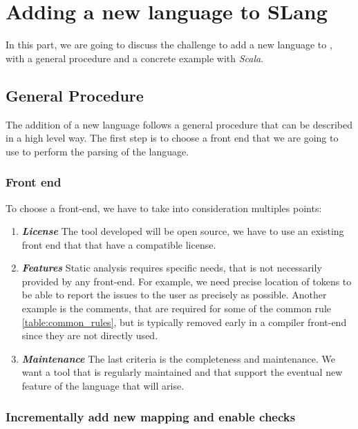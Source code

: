 \section{Adding a new language to SLang}
\label{sec:new_language}

In this part, we are going to discuss the challenge to add a new language to \slang{}, with a general procedure and a concrete example with \emph{Scala}.

\subsection{General Procedure}
\label{subsec:general_procedure}

The addition of a new language follows a general procedure that can be described in a high level way.
The first step is to choose a front end that we are going to use to perform the parsing of the language.

\subsubsection{Front end}
\label{subsubsec:front_end}

To choose a front-end, we have to take into consideration multiples points:
\begin{enumerate}
	\item \textbf{\textit{License}} \newline The tool developed will be open source, we have to use an existing front end that that have a compatible license.
	\item \textbf{\textit{Features}} \newline Static analysis requires specific needs, that is not necessarily provided by any front-end. 	For example, we need precise location of tokens to be able to report the issues to the user as precisely as possible. Another example is the comments, that are required for some of the common rule \ref{table:common_rules}, but is typically removed early in a compiler front-end since they are not directly used.
	\item \textbf{\textit{Maintenance}} \newline 
	The last criteria is the completeness and maintenance. We want a tool that is regularly maintained and that support the eventual new feature of the language that will arise. 
\end{enumerate}

\subsubsection{Incrementally add new mapping and enable checks}
\label{subsubsec:new_mapping_and_enables_rules}

